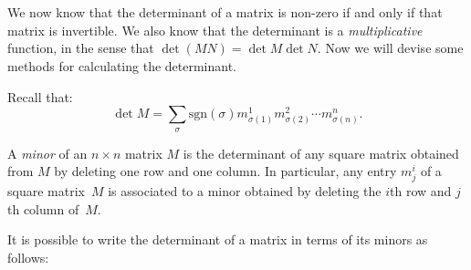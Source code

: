 

\newpage

\section{\propDetTitle}

We now know that the determinant of a matrix is non-zero if and only if that matrix is invertible.  We also 
know 
that the determinant is a \emph{multiplicative} function, in the sense that $\det (MN)=\det M \det N$.  Now we will devise some methods for calculating the determinant.

Recall that:
\[
\det M = \sum_{\sigma} \text{sgn}(\sigma) m^1_{\sigma(1)}m^2_{\sigma(2)}\cdots m^n_{\sigma(n)}.
\]

A \emph{minor} of an $n\times n$ matrix $M$ is the determinant of any square matrix obtained from $M$ by deleting one row and one column.  In particular, any entry $m^i_j$ of a square matrix~$M$ is associated to a minor obtained by deleting the $i$th row and $j$th column of~$M$.

It is possible to write the determinant of a matrix in terms of  its minors as follows:

